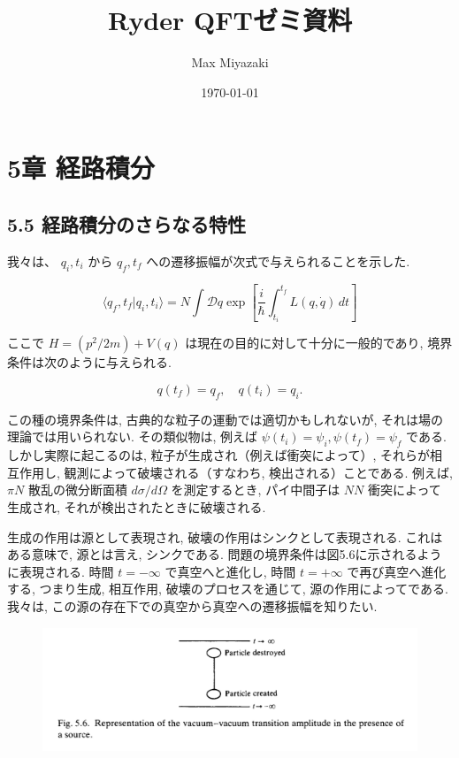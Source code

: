 \documentclass{jsarticle}
\title{Ryder QFTゼミ資料}
\date{\today}
\author{Max Miyazaki}
\begin{document}
\maketitle
\section*{\textrm{5章 経路積分}}
\subsection*{\textrm{5.5 経路積分のさらなる特性}}

我々は、 \( q_i, t_i \) から \( q_f, t_f \) への遷移振幅が次式で与えられることを示した.

\begin{equation*}
\langle q_f, t_f | q_i, t_i \rangle = N \int \mathcal{D}q \exp \left[ \frac{i}{\hbar} \int_{t_i}^{t_f} L(q, \dot{q}) \, dt \right]
\end{equation*}

ここで \( H = \left( p^2/2m \right) + V(q) \) は現在の目的に対して十分に一般的であり, 境界条件は次のように与えられる.

\begin{equation*}
q(t_f) = q_f, \quad q(t_i) = q_i.
\end{equation*}

この種の境界条件は, 古典的な粒子の運動では適切かもしれないが, それは場の理論では用いられない. その類似物は, 例えば \( \psi(t_i) = \psi_i, \psi(t_f) = \psi_f \) である. しかし実際に起こるのは, 粒子が生成され（例えば衝突によって）, それらが相互作用し, 観測によって破壊される（すなわち, 検出される）ことである. 例えば, \( \pi N \) 散乱の微分断面積 \( d\sigma/d\Omega \) を測定するとき, パイ中間子は \( NN \) 衝突によって生成され, それが検出されたときに破壊される.

生成の作用は源として表現され, 破壊の作用はシンクとして表現される. これはある意味で, 源とは言え, シンクである. 問題の境界条件は図5.6に示されるように表現される. 時間 \( t = -\infty \) で真空へと進化し, 時間 \( t = +\infty \) で再び真空へ進化する, つまり生成, 相互作用, 破壊のプロセスを通じて, 源の作用によってである. 我々は, この源の存在下での真空から真空への遷移振幅を知りたい.

\begin{figure}[H]
    \centering
    \includegraphics[width=\textwidth]{figure/fig5-6.png}    
\end{figure}
\end{document}
